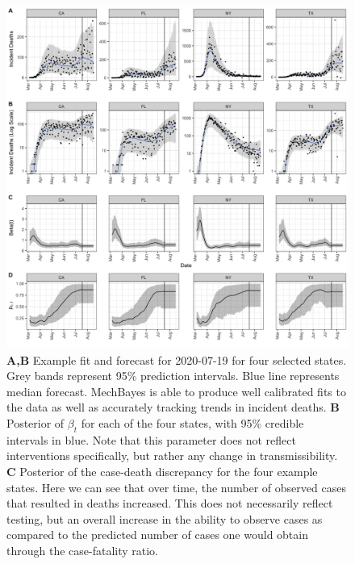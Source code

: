 \documentclass[11pt]{amsart}
\begin{document}
\begin{figure}

    \includegraphics[scale=.15]{fig3.png}

\caption{\textbf{A,B} Example fit and forecast for 2020-07-19 for four selected states. Grey bands represent 95\% prediction intervals. Blue line represents median forecast. MechBayes is able to produce well calibrated fits to the data as well as accurately tracking trends in incident deaths. \textbf{B} Posterior of $\beta_t$ for each of the four states, with 95\% credible intervals in blue. Note that this parameter does not reflect interventions specifically, but rather any change in transmissibility. \textbf{C} Posterior of the case-death discrepancy for the four example states. Here we can see that over time, the number of observed cases that resulted in deaths increased. This does not necessarily reflect testing, but an overall increase in the ability to observe cases as compared to the predicted number of cases one would obtain through the case-fatality ratio. }
\label{fig:fit_and_forecast_results}
\end{figure}
\end{document}
